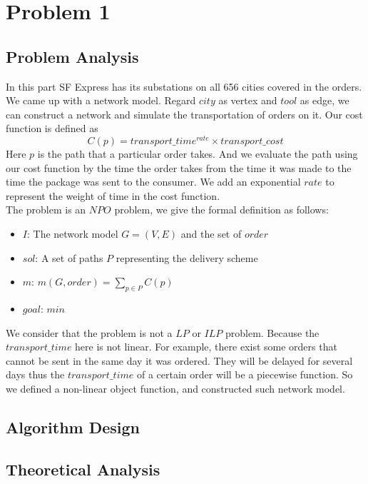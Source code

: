 \documentclass{llncs}
\begin{document}
\section{Problem 1}
\subsection{Problem Analysis}
In this part SF Express has its substations on all 656 cities covered in the orders. We came up with a network model. Regard $city$ as vertex and $tool$ as edge, 
we can construct a network and simulate the transportation of orders on it. Our cost function is defined as $$C(p)=transport\_time^{rate}  \times transport\_cost$$
Here $p$ is the path that a particular order takes. And we evaluate the path using our cost function by the time the order takes from the time it was made to the time the 
package was sent to the consumer. We add an exponential $rate$ to represent the weight of time in the cost function. \\
The problem is an $NPO$ problem, we give the formal definition as follows:
\begin{itemize}
  \item $I$: The network model $G=(V,E)$ and the set of $order$
  \item $sol$: A set of paths $P$ representing the delivery scheme
  \item $m$: $m(G,order)=\sum_{p \in P}C(p)$
  \item $goal$: $min$
\end{itemize}
We consider that the problem is not a $LP$ or $ILP$ problem. Because the $transport\_time$ here is not linear. For example, there exist some orders that cannot be sent in the same day it was ordered. 
They will be delayed for several days thus the $transport\_time$ of a certain order will be a piecewise function.
So we defined a non-linear object function, and constructed such network model.
\subsection{Algorithm Design}
\subsection{Theoretical Analysis}
\end{document}
